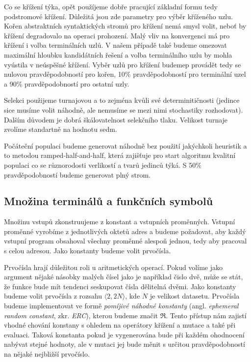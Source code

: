 Co se křížení týka, opět použíjeme dobře pracující základní formu tedy podstromové křížení. Důležitá jsou zde parametry pro výběr kříženého uzlu. 
Kořen abstraktních syntaktických stromů pro křížení nemá smysl volit, neboť by křížení degradovalo na operaci prohození. Malý vliv na konvergenci
má  pro křížení i volba terminálních uzlů. V našem případě také budeme omezovat maximální hloubku kandidátních řešení a volba terminálního uzlu
by mohla vyústila v neúspěšné křížení. Vyběr uzlů pro křížení budemep provádět tedy se nulovou pravděpodobností pro kořen, 10\% pravděpodobností
pro terminální uzel a 90\% pravděpodobností pro ostatní uzly.

Selekci použijeme turnajovou a to zejména kvůli své determinitičnosti (jedince sice musíme volit náhodně, ale nemusíme se mezi nimi stochastiky rozhodovat).
Dalším důvodem je dobrá škálovatelnost selekčního tlaku. Velikost turnaje zvolíme standartně na hodnotu sedm.

Počáteční populaci budeme generovat náhodně bez použití jakýchkoli heuristik a to metodou ramped-half-and-half, která zajišťuje pro start algoritmu
kvalitní populaci co se různorodosti verlikostí a tvarů jedinců týká. S 50\% pravděpodobností budeme generovat plný strom.

\subsection{Množina terminálů a funkčních symbolů}

Množinu vstupů zkonstruujeme z konstant a vstupních proměnných. Vstupní
proměnné vyrobíme z jednotlivých oktetů adres a budeme požadovat, aby každý
vstupní program obsahoval všechny proměnné alespoň jednou, tedy aby pracoval
s celou adresou. Jako konstanty budeme volit prvočísla. 

Prvočísla hrají důležitou roli u aritmetických operací. Pokud volíme jako argument nějaké
násobky malých čísel jako je například čislo dvě, může se stát, že funkce bude
mít tendenci seskupovat čísla dělitelná dvěmi. Jako konstanty budeme volit
prvočísla z rozsahu $\langle 2, 2N \rangle$, kde $N$ je velikost datasetu. Prvočísla
budeme implementovat ve formě \textit{pomíjivé náhodné konstanty} (angl. \textit{ephemeral
random constant}, zkr. \textit{ERC}), kterou budeme značit $\Re$. Tento přístup nám
zajistí vhodné chování konstany s ohledem na operátory křížení a mutace a také při
evaluaci. Taková konstanta pokud je vygenerována bude při každém ohodnocení 
nabývat stejné hodnoty, ale v mutaci jej bude měnit s určitou pravděpodobností na
nějaké nejbližší prvočíslo. 

